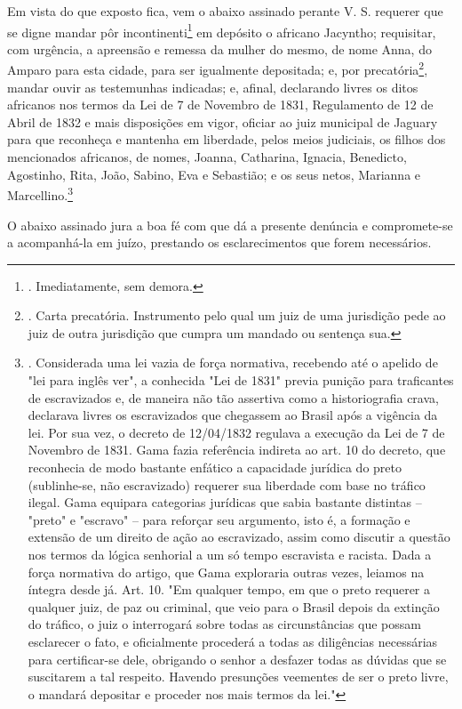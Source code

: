 Em vista do que exposto fica, vem o abaixo assinado perante V. S.
requerer que se digne mandar pôr incontinenti\footnote{. Imediatamente,
  sem demora.} em depósito o africano Jacyntho; requisitar, com
urgência, a apreensão e remessa da mulher do mesmo, de nome Anna, do
Amparo para esta cidade, para ser igualmente depositada; e, por
precatória\footnote{. Carta precatória. Instrumento pelo qual um juiz de
  uma jurisdição pede ao juiz de outra jurisdição que cumpra um mandado
  ou sentença sua.}, mandar ouvir as testemunhas indicadas; e, afinal,
declarando livres os ditos africanos nos termos da Lei de 7 de Novembro
de 1831, Regulamento de 12 de Abril de 1832 e mais disposições em vigor,
oficiar ao juiz municipal de Jaguary para que reconheça e mantenha em
liberdade, pelos meios judiciais, os filhos dos mencionados africanos,
de nomes, Joanna, Catharina, Ignacia, Benedicto, Agostinho, Rita, João,
Sabino, Eva e Sebastião; e os seus netos, Marianna e
Marcellino.\footnote{. Considerada uma lei vazia de força normativa,
  recebendo até o apelido de "lei para inglês ver", a conhecida "Lei de
  1831" previa punição para traficantes de escravizados e, de maneira
  não tão assertiva como a historiografia crava, declarava livres os
  escravizados que chegassem ao Brasil após a vigência da lei. Por sua
  vez, o decreto de 12/04/1832 regulava a execução da Lei de 7 de
  Novembro de 1831. Gama fazia referência indireta ao art. 10 do
  decreto, que reconhecia de modo bastante enfático a capacidade
  jurídica do preto (sublinhe-se, não escravizado) requerer sua
  liberdade com base no tráfico ilegal. Gama equipara categorias
  jurídicas que sabia bastante distintas -- "preto" e "escravo" -- para
  reforçar seu argumento, isto é, a formação e extensão de um direito de
  ação ao escravizado, assim como discutir a questão nos termos da
  lógica senhorial a um só tempo escravista e racista. Dada a força
  normativa do artigo, que Gama exploraria outras vezes, leiamos na
  íntegra desde já. Art. 10. "Em qualquer tempo, em que o preto requerer
  a qualquer juiz, de paz ou criminal, que veio para o Brasil depois da
  extinção do tráfico, o juiz o interrogará sobre todas as
  circunstâncias que possam esclarecer o fato, e oficialmente procederá
  a todas as diligências necessárias para certificar-se dele, obrigando
  o senhor a desfazer todas as dúvidas que se suscitarem a tal respeito.
  Havendo presunções veementes de ser o preto livre, o mandará depositar
  e proceder nos mais termos da lei."}

O abaixo assinado jura a boa fé com que dá a presente denúncia e
compromete-se a acompanhá-la em juízo, prestando os esclarecimentos que
forem necessários.

